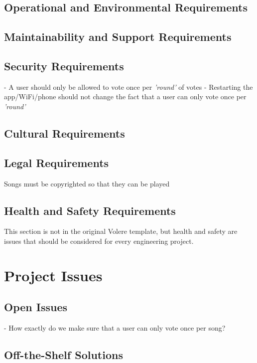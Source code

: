 \documentclass[12pt, titlepage]{article}
\begin{document}
\subsection{Operational and Environmental Requirements}

\subsection{Maintainability and Support Requirements}

\subsection{Security Requirements}

- A user should only be allowed to vote once per \textit{'round'} of votes
- Restarting the app/WiFi/phone should not change the fact that a user can only
  vote once per \textit{'round'}

\subsection{Cultural Requirements}

\subsection{Legal Requirements}
Songs must be copyrighted so that they can be played 
\subsection{Health and Safety Requirements}

This section is not in the original Volere template, but health and safety are
issues that should be considered for every engineering project.

\section{Project Issues}

\subsection{Open Issues}

- How exactly do we make sure that a user can only vote once per song?

\subsection{Off-the-Shelf Solutions}
\end{document}
